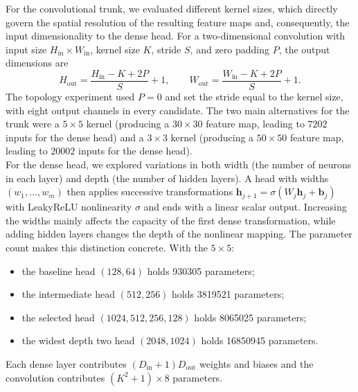 For the convolutional trunk, we evaluated different kernel sizes, which directly govern the spatial resolution of the resulting feature maps and, consequently, the input dimensionality to the dense head. For a two-dimensional convolution with input size $H_{\mathrm{in}}\times W_{\mathrm{in}}$, kernel size $K$, stride $S$, and zero padding $P$, the output dimensions are
\begin{equation}
    H_{\mathrm{out}} = \frac{H_{\mathrm{in}}-K+2P}{S}+1,
    \qquad
    W_{\mathrm{out}} = \frac{W_{\mathrm{in}}-K+2P}{S}+1.
    \label{eq:04_topology_convolution}
\end{equation}
The topology experiment used $P=0$ and set the stride equal to the kernel size, with eight output channels in every candidate. The two main alternatives for the trunk were a $5\times5$ kernel (producing a $30\times30$ feature map, leading to $7202$ inputs for the dense head) and a $3\times3$ kernel (producing a $50\times50$ feature map, leading to $20002$ inputs for the dense head).\\

For the dense head, we explored variations in both width (the number of neurons in each layer) and depth (the number of hidden layers). A head with widths $(w_1,\ldots,w_m)$ then applies successive transformations $\mathbf{h}_{j+1}=\sigma(W_j\mathbf{h}_j+\mathbf{b}_j)$ with LeakyReLU nonlinearity $\sigma$ and ends with a linear scalar output. Increasing the widths mainly affects the capacity of the first dense transformation, while adding hidden layers changes the depth of the nonlinear mapping. 
The parameter count makes this distinction concrete. With the $5\times5$:
\begin{itemize}
    \item[-] the baseline head $(128,64)$ holds 930305 parameters;
    \item[-] the intermediate head $(512,256)$ holds 3819521 parameters;
    \item[-] the selected head $(1024,512,256,128)$ holds 8065025 parameters;
    \item[-] the widest depth two head $(2048,1024)$ holds 16850945 parameters.
\end{itemize}
Each dense layer contributes $(D_{\mathrm{in}}+1)D_{\mathrm{out}}$ weights and biases and the convolution contributes $(K^2+1)\times 8$ parameters.\\

